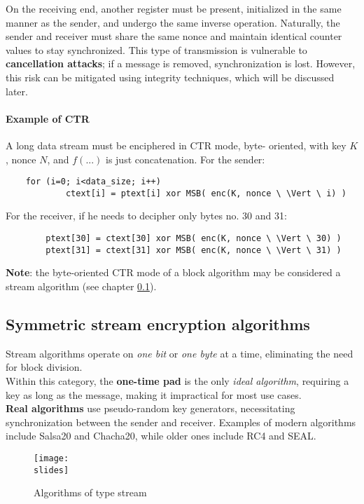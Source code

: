 On the receiving end, another register must be present, initialized in the same manner as the sender, and undergo the same inverse operation. Naturally, the sender and receiver must share the same nonce and maintain identical counter values to stay synchronized. This type of transmission is vulnerable to \textbf{cancellation attacks}; if a message is removed, synchronization is lost. However, this risk can be mitigated using integrity techniques, which will be discussed later.

\paragraph{Example of CTR}
A long data stream must be enciphered in CTR mode, byte-
oriented, with key $K$, nonce $N$, and $f(...)$ is just concatenation.
For the sender:
\begin{verbatim}
    for (i=0; i<data_size; i++)
            ctext[i] = ptext[i] xor MSB( enc(K, nonce \ \Vert \ i) )
\end{verbatim}
For the receiver, if he needs to decipher only bytes no. 30 and 31:
\begin{verbatim}
        ptext[30] = ctext[30] xor MSB( enc(K, nonce \ \Vert \ 30) )
        ptext[31] = ctext[31] xor MSB( enc(K, nonce \ \Vert \ 31) )
\end{verbatim}

\textbf{Note}: the byte-oriented CTR mode of a block algorithm may be considered a stream algorithm (see chapter \ref{chap:symmetricstream}).

\newpage
\subsection{Symmetric stream encryption algorithms}\label{chap:symmetricstream}

Stream algorithms operate on \textit{one bit} or \textit{one byte} at a time, eliminating the need for block division. \\
Within this category, the \textbf{one-time pad} is the only \textit{ideal algorithm}, requiring a key as long as the message, making it impractical for most use cases.\\
\textbf{Real algorithms} use pseudo-random key generators, necessitating synchronization between the sender and receiver. Examples of modern algorithms include Salsa20 and Chacha20, while older ones include RC4 and SEAL.

\begin{figure}[h]
    \centering
    \texttt{[image: \\slides]}
    \caption{Algorithms of type stream}
\end{figure}

